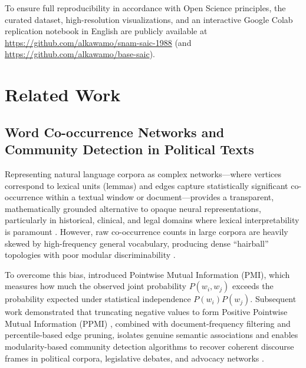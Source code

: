 \documentclass[pdflatex,sn-mathphys,iicol]{sn-jnl}
\begin{document}
To ensure full reproducibility in accordance with Open Science principles, the curated dataset, high-resolution visualizations, and an interactive Google Colab replication notebook in English are publicly available at \url{https://github.com/alkawamo/snam-saic-1988} (and \url{https://github.com/alkawamo/base-saic}).

\section{Related Work}\label{sec2}
\subsection{Word Co-occurrence Networks and Community Detection in Political Texts}
Representing natural language corpora as complex networks---where vertices correspond to lexical units (lemmas) and edges capture statistically significant co-occurrence within a textual window or document---provides a transparent, mathematically grounded alternative to opaque neural representations, particularly in historical, clinical, and legal domains where lexical interpretability is paramount \citep{mota2012speech,amancio2015complex,quispe2021using,amancio2025leveraging}. However, raw co-occurrence counts in large corpora are heavily skewed by high-frequency general vocabulary, producing dense ``hairball'' topologies with poor modular discriminability \citep{turney2010frequency,quispe2021using}.

To overcome this bias, \citet{church1990word} introduced Pointwise Mutual Information (PMI), which measures how much the observed joint probability $P(w_i, w_j)$ exceeds the probability expected under statistical independence $P(w_i)P(w_j)$. Subsequent work demonstrated that truncating negative values to form Positive Pointwise Mutual Information (PPMI) \citep{bullinaria2007extracting,turney2010frequency}, combined with document-frequency filtering and percentile-based edge pruning, isolates genuine semantic associations and enables modularity-based community detection algorithms \citep{newman2006modularity,blondel2008fast,fortunato2010community,cordeiro2016dynamic,traag2019louvain} to recover coherent discourse frames in political corpora, legislative debates, and advocacy networks \citep{grimmer2013text,stieglitz2013social,rule2015lexical,bail2016combining}.
\end{document}
